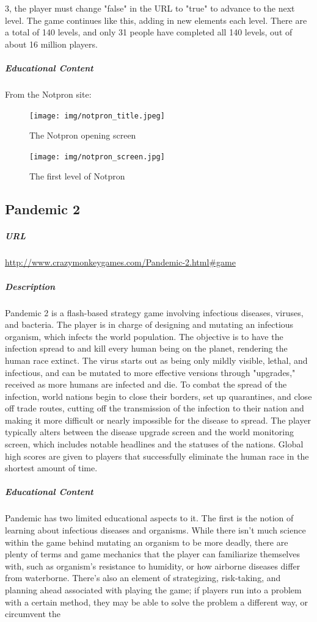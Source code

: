 3, the player must change "false" in the URL to "true" to advance to the next level. The game continues like this, adding in new elements each level. There are a total of 140 levels, and only 31 people have completed all 140 levels, out of about 16 million players.\subparagraph{Educational Content}From the Notpron site: \begin{figure}[h!]\centering \texttt{[image: img/notpron\_title.jpeg]}\caption{The Notpron opening screen}\end{figure}\begin{figure}[h!]\centering \texttt{[image: img/notpron\_screen.jpg]}\caption{The first level of Notpron}\end{figure}\newpage\subsection{Pandemic 2}\subparagraph{URL}\url{http://www.crazymonkeygames.com/Pandemic-2.html#game}\subparagraph{Description}Pandemic 2 is a flash-based strategy game involving infectious diseases, viruses, and bacteria. The player is in charge of designing and mutating an infectious organism, which infects the world population. The objective is to have the infection spread to and kill every human being on the planet, rendering the human race extinct. The virus starts out as being only mildly visible, lethal, and infectious, and can be mutated to more effective versions through "upgrades," received as more humans are infected and die. To combat the spread of the infection, world nations begin to close their borders, set up quarantines, and close off trade routes, cutting off the transmission of the infection to their nation and making it more difficult or nearly impossible for the disease to spread. The player typically alters between the disease upgrade screen and the world monitoring screen, which includes notable headlines and the statuses of the nations. Global high scores are given to players that successfully eliminate the human race in the shortest amount of time.\subparagraph{Educational Content}Pandemic has two limited educational aspects to it. The first is the notion of learning about infectious diseases and organisms. While there isn't much science within the game behind mutating an organism to be more deadly, there are plenty of terms and game mechanics that the player can familiarize themselves with, such as organism's resistance to humidity, or how airborne diseases differ from waterborne. There's also an element of strategizing, risk-taking, and planning ahead associated with playing the game; if players run into a problem with a certain method, they may be able to solve the problem a different way, or circumvent the 